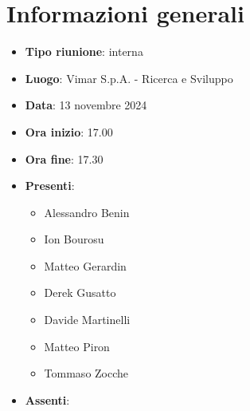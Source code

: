 \section{Informazioni generali}
\begin{itemize}
  \item \textbf{Tipo riunione}: interna
  \item \textbf{Luogo}: Vimar S.p.A. - Ricerca e Sviluppo 
  \item \textbf{Data}: 13 novembre 2024
  \item \textbf{Ora inizio}: 17.00
  \item \textbf{Ora fine}: 17.30
  
  \item \textbf{Presenti}:
  \begin{itemize}
    \item Alessandro Benin
    \item Ion Bourosu
    \item Matteo Gerardin
    \item Derek Gusatto
    \item Davide Martinelli
    \item Matteo Piron
    \item Tommaso Zocche
  \end{itemize}

  \item \textbf{Assenti}:
 
\end{itemize}